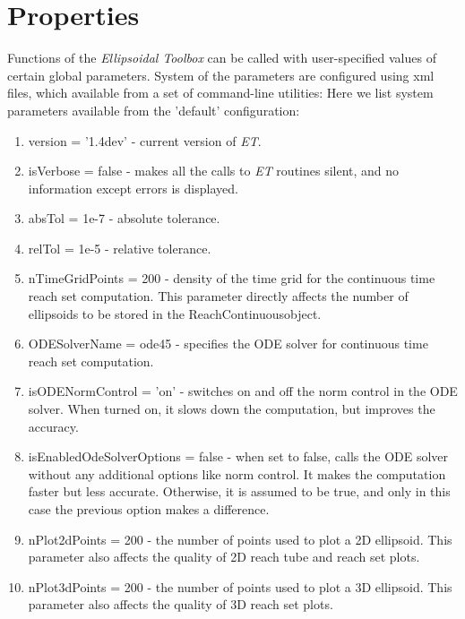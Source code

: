 \documentclass[letterpaper,10pt,english]{sphinxmanual}
\begin{document}
\section{Properties}
\label{chap_implement:properties}
Functions of the \emph{Ellipsoidal Toolbox} can be called with user-specified
values of certain global parameters. System of the parameters are
configured using xml files, which available from a set of command-line
utilities: Here we list system parameters available from the ’default’
configuration:
\begin{enumerate}
\item {} 
version = ’1.4dev’ - current version of \emph{ET}.

\item {} 
isVerbose = false - makes all the calls to \emph{ET} routines silent, and
no information except errors is displayed.

\item {} 
absTol = 1e-7 - absolute tolerance.

\item {} 
relTol = 1e-5 - relative tolerance.

\item {} 
nTimeGridPoints = 200 - density of the time grid for the continuous
time reach set computation. This parameter directly affects the
number of ellipsoids to be stored in the
ReachContinuous\backslashReachDiscrete object.

\item {} 
ODESolverName = ode45 - specifies the ODE solver for continuous time
reach set computation.

\item {} 
isODENormControl = ’on’ - switches on and off the norm control in the
ODE solver. When turned on, it slows down the computation, but
improves the accuracy.

\item {} 
isEnabledOdeSolverOptions = false - when set to false, calls the ODE
solver without any additional options like norm control. It makes the
computation faster but less accurate. Otherwise, it is assumed to be
true, and only in this case the previous option makes a difference.

\item {} 
nPlot2dPoints = 200 - the number of points used to plot a 2D
ellipsoid. This parameter also affects the quality of 2D reach tube
and reach set plots.

\item {} 
nPlot3dPoints = 200 - the number of points used to plot a 3D
ellipsoid. This parameter also affects the quality of 3D reach set
plots.

\end{enumerate}
\end{document}
